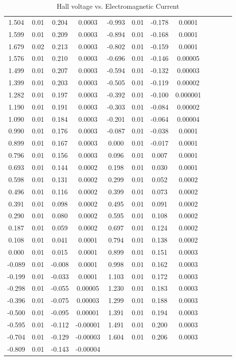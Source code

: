 \begin{enumerate}[resume]
\begin{table}[h]
\begin{tabular}{|c|c|c|c|c|c|c|c|c|c|c|c|}
      1.504&0.01&0.204&0.0003&-0.993&0.01&-0.178&0.0001\\
      1.599&0.01&0.209&0.0003&-0.894&0.01&-0.168&0.0001\\
      1.679&0.02&0.213&0.0003&-0.802&0.01&-0.159&0.0001\\
      1.576&0.01&0.210&0.0003&-0.696&0.01&-0.146&0.00005\\
      1.499&0.01&0.207&0.0003&-0.594&0.01&-0.132&0.00003\\
      1.399&0.01&0.203&0.0003&-0.505&0.01&-0.119&0.00002\\
      1.282&0.01&0.197&0.0003&-0.392&0.01&-0.100&0.000001\\
      1.190&0.01&0.191&0.0003&-0.303&0.01&-0.084&0.00002\\
      1.090&0.01&0.184&0.0003&-0.201&0.01&-0.064&0.00004\\
      0.990&0.01&0.176&0.0003&-0.087&0.01&-0.038&0.0001\\
      0.899&0.01&0.167&0.0003&0.000&0.01&-0.017&0.0001\\
      0.796&0.01&0.156&0.0003&0.096&0.01&0.007&0.0001\\
      0.693&0.01&0.144&0.0002&0.198&0.01&0.030&0.0001\\
      0.598&0.01&0.131&0.0002&0.299&0.01&0.052&0.0002\\
      0.496&0.01&0.116&0.0002&0.399&0.01&0.073&0.0002\\
      0.391&0.01&0.098&0.0002&0.495&0.01&0.091&0.0002\\
      0.290&0.01&0.080&0.0002&0.595&0.01&0.108&0.0002\\
      0.187&0.01&0.059&0.0002&0.697&0.01&0.124&0.0002\\
      0.108&0.01&0.041&0.0001&0.794&0.01&0.138&0.0002\\
      0.000&0.01&0.015&0.0001&0.899&0.01&0.151&0.0003\\
      -0.089&0.01&-0.008&0.0001&0.998&0.01&0.162&0.0003\\
      -0.199&0.01&-0.033&0.0001&1.103&0.01&0.172&0.0003\\
      -0.298&0.01&-0.055&0.00005&1.230&0.01&0.183&0.0003\\
      -0.396&0.01&-0.075&0.00003&1.299&0.01&0.188&0.0003\\
      -0.500&0.01&-0.095&0.00001&1.391&0.01&0.194&0.0003\\
      -0.595&0.01&-0.112&-0.00001&1.491&0.01&0.200&0.0003\\
      -0.704&0.01&-0.129&-0.00003&1.604&0.01&0.206&0.0003\\
      -0.809&0.01&-0.143&-0.00004&&&&\\
      \hline
    \end{tabular}
    \label{tbl:HMTable1}
    \caption{Hall voltage vs. Electromagnetic Current}
  \end{table}


\end{enumerate}

